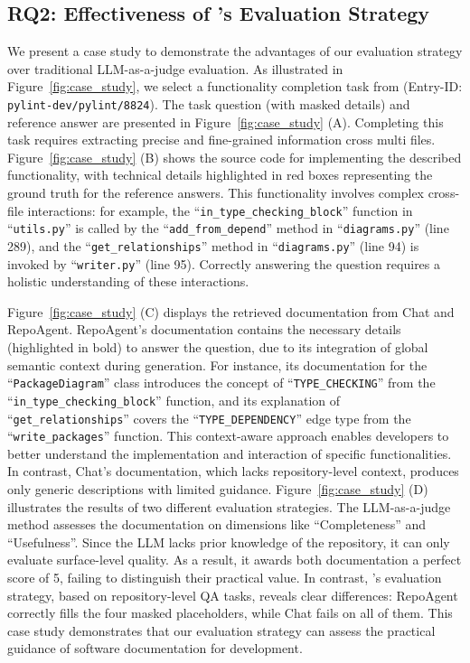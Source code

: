 \subsection{RQ2: Effectiveness of \benchmark's Evaluation Strategy}
We present a case study to demonstrate the advantages of our evaluation strategy over traditional LLM-as-a-judge evaluation. As illustrated in Figure~\ref{fig:case_study}, we select a functionality completion task from \benchmark (Entry-ID: \texttt{pylint-dev/pylint/8824}). The task question (with masked details) and reference answer are presented in Figure~\ref{fig:case_study} (A). Completing this task requires extracting precise and fine-grained information cross multi files. Figure~\ref{fig:case_study} (B) shows the source code for implementing the described functionality, with technical details highlighted in red boxes representing the ground truth for the reference answers. This functionality involves complex cross-file interactions: for example, the ``\texttt{in\_type\_checking\_block}'' function in ``\texttt{utils.py}'' is called by the ``\texttt{add\_from\_depend}'' method in ``\texttt{diagrams.py}'' (line 289), and the ``\texttt{get\_relationships}'' method in ``\texttt{diagrams.py}'' (line 94) is invoked by ``\texttt{writer.py}'' (line 95). Correctly answering the question requires a holistic understanding of these interactions.

Figure~\ref{fig:case_study} (C) displays the retrieved documentation from Chat and RepoAgent. RepoAgent's documentation contains the necessary details (highlighted in bold) to answer the question, due to its integration of global semantic context during generation. For instance, its documentation for the ``\texttt{PackageDiagram}'' class introduces the concept of ``\texttt{TYPE\_CHECKING}'' from the ``\texttt{in\_type\_checking\_block}'' function, and its explanation of ``\texttt{get\_relationships}'' covers the ``\texttt{TYPE\_DEPENDENCY}'' edge type from the ``\texttt{write\_packages}'' function. This context-aware approach enables developers to better understand the implementation and interaction of specific functionalities.
In contrast, Chat's documentation, which lacks repository-level context, produces only generic descriptions with limited guidance. Figure~\ref{fig:case_study} (D) illustrates the results of two different evaluation strategies. The LLM-as-a-judge method assesses the documentation on dimensions like ``Completeness'' and ``Usefulness''. Since the LLM lacks prior knowledge of the repository, it can only evaluate surface-level quality. As a result, it awards both documentation a perfect score of 5, failing to distinguish their practical value. In contrast, \benchmark's evaluation strategy, based on repository-level QA tasks, reveals clear differences: RepoAgent correctly fills the four masked placeholders, while Chat fails on all of them. This case study demonstrates that our evaluation strategy can assess the practical guidance of software documentation for development.

